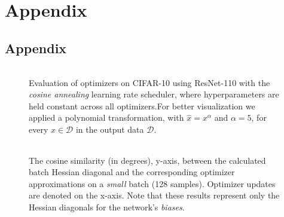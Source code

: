 \chapter{Appendix}


\section{Appendix}
\begin{figure}[h!]
    \centering
    \begin{tabular}{cc}
         \\ 
        
    \end{tabular}
    \caption{Evaluation of optimizers on CIFAR-10 using ResNet-110 with the \emph{cosine annealing} learning rate scheduler, where hyperparameters
    are held constant across all optimizers.For better visualization we applied a polynomial transformation, with $\hat{x}=x^\alpha$ and $\alpha=5$, for every $x \in \mathcal{D}$ in the output data $ \mathcal{D}$.}
    \label{fig:cifar-10-cosine-real}
\end{figure}

\begin{figure}[h!]
    \centering
    \begin{tabular}{cc}
         \\ %
    \end{tabular}
    \caption{The cosine similarity (in degrees), y-axis, between the calculated batch Hessian diagonal and the corresponding optimizer approximations on a \emph{small} batch (128 samples).
    Optimizer updates are denoted on the x-axis.
    Note that these results represent only the Hessian diagonals for the network's \emph{biases}.}
    \label{fig:cosine-bias-small-batch}
\end{figure}

